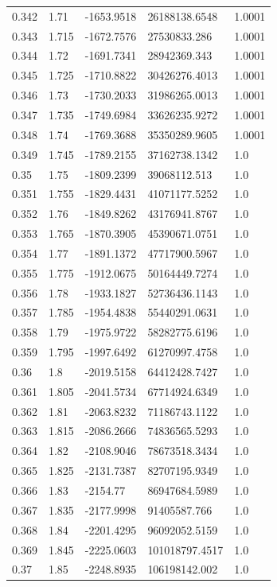 \begin{tabular}{lllll}
0.342 & 1.71 & -1653.9518 & 26188138.6548 & 1.0001 \\
0.343 & 1.715 & -1672.7576 & 27530833.286 & 1.0001 \\
0.344 & 1.72 & -1691.7341 & 28942369.343 & 1.0001 \\
0.345 & 1.725 & -1710.8822 & 30426276.4013 & 1.0001 \\
0.346 & 1.73 & -1730.2033 & 31986265.0013 & 1.0001 \\
0.347 & 1.735 & -1749.6984 & 33626235.9272 & 1.0001 \\
0.348 & 1.74 & -1769.3688 & 35350289.9605 & 1.0001 \\
0.349 & 1.745 & -1789.2155 & 37162738.1342 & 1.0 \\
0.35 & 1.75 & -1809.2399 & 39068112.513 & 1.0 \\
0.351 & 1.755 & -1829.4431 & 41071177.5252 & 1.0 \\
0.352 & 1.76 & -1849.8262 & 43176941.8767 & 1.0 \\
0.353 & 1.765 & -1870.3905 & 45390671.0751 & 1.0 \\
0.354 & 1.77 & -1891.1372 & 47717900.5967 & 1.0 \\
0.355 & 1.775 & -1912.0675 & 50164449.7274 & 1.0 \\
0.356 & 1.78 & -1933.1827 & 52736436.1143 & 1.0 \\
0.357 & 1.785 & -1954.4838 & 55440291.0631 & 1.0 \\
0.358 & 1.79 & -1975.9722 & 58282775.6196 & 1.0 \\
0.359 & 1.795 & -1997.6492 & 61270997.4758 & 1.0 \\
0.36 & 1.8 & -2019.5158 & 64412428.7427 & 1.0 \\
0.361 & 1.805 & -2041.5734 & 67714924.6349 & 1.0 \\
0.362 & 1.81 & -2063.8232 & 71186743.1122 & 1.0 \\
0.363 & 1.815 & -2086.2666 & 74836565.5293 & 1.0 \\
0.364 & 1.82 & -2108.9046 & 78673518.3434 & 1.0 \\
0.365 & 1.825 & -2131.7387 & 82707195.9349 & 1.0 \\
0.366 & 1.83 & -2154.77 & 86947684.5989 & 1.0 \\
0.367 & 1.835 & -2177.9998 & 91405587.766 & 1.0 \\
0.368 & 1.84 & -2201.4295 & 96092052.5159 & 1.0 \\
0.369 & 1.845 & -2225.0603 & 101018797.4517 & 1.0 \\
0.37 & 1.85 & -2248.8935 & 106198142.002 & 1.0 \\

\end{tabular}
